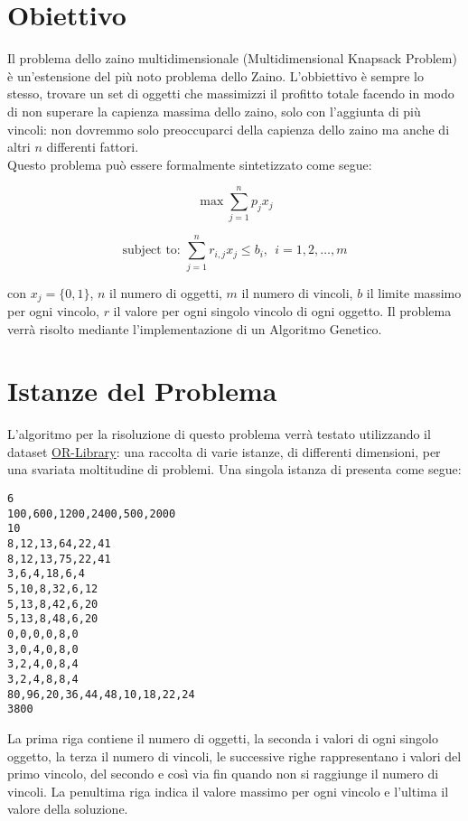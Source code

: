 \section{Obiettivo}
Il problema dello zaino multidimensionale (Multidimensional Knapsack Problem) è
un'estensione del più noto problema dello Zaino. L'obbiettivo è sempre lo
stesso, trovare un set di oggetti che massimizzi il profitto totale facendo in
modo di non superare la capienza massima dello zaino, solo con l'aggiunta di più
vincoli: non dovremmo solo preoccuparci della capienza dello zaino ma anche di
altri $n$ differenti fattori.\\

Questo problema può essere formalmente sintetizzato come segue:

\[
    \max \sum_{j=1}^{n} p_j x_j
\]

\[
    \text{subject to: } \sum_{j=1}^{n} r_{i,j} x_j \leq b_i, \ \ i = 1,2,\ldots, m
\]

con $x_j = \{0, 1\}$, $n$ il numero di oggetti, $m$ il numero di vincoli, $b$ il limite massimo per ogni vincolo,
$r$ il valore per ogni singolo vincolo di ogni oggetto.
Il problema verrà risolto mediante l'implementazione di un Algoritmo Genetico.

\section{Istanze del Problema}

L'algoritmo per la risoluzione di questo problema verrà testato utilizzando il dataset
\href{http://people.brunel.ac.uk/~mastjjb/jeb/orlib/mknapinfo.html}{OR-Library}: una
raccolta di varie istanze, di differenti dimensioni, per una svariata moltitudine di
problemi. Una singola istanza di presenta come segue:

\begin{lstlisting}[caption={Esempio di Istanza di un problema MKP con 6 oggetti e 10 vincoli.}]
6
100,600,1200,2400,500,2000
10
8,12,13,64,22,41
8,12,13,75,22,41
3,6,4,18,6,4
5,10,8,32,6,12
5,13,8,42,6,20
5,13,8,48,6,20
0,0,0,0,8,0
3,0,4,0,8,0
3,2,4,0,8,4
3,2,4,8,8,4
80,96,20,36,44,48,10,18,22,24
3800
\end{lstlisting}

La prima riga contiene il numero di oggetti, la seconda i valori di ogni singolo
oggetto, la terza il numero di vincoli, le successive righe rappresentano i
valori del primo vincolo, del secondo e così via fin quando non si raggiunge il
numero di vincoli. La penultima riga indica il valore massimo per ogni vincolo e
l'ultima il valore della soluzione.

